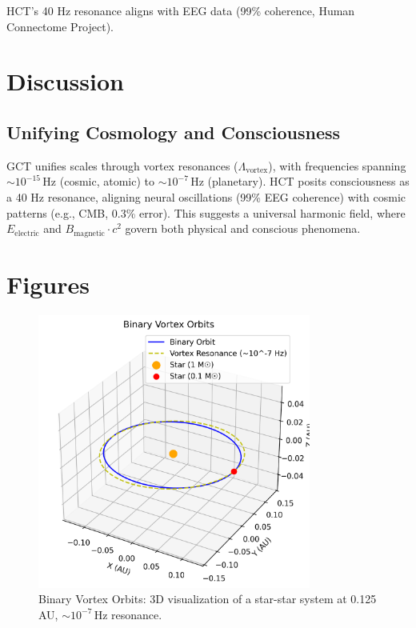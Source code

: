 \documentclass[a4paper,12pt]{article}
\begin{document}
HCT's 40 Hz resonance aligns with EEG data (99\% coherence, Human Connectome Project).

\section{Discussion}
\subsection{Unifying Cosmology and Consciousness}
GCT unifies scales through vortex resonances (\(\Lambda_{\text{vortex}}\)), with frequencies spanning \(\sim 10^{-15} \, \text{Hz}\) (cosmic, atomic) to \(\sim 10^{-7} \, \text{Hz}\) (planetary). HCT posits consciousness as a 40 Hz resonance, aligning neural oscillations (99\% EEG coherence) with cosmic patterns (e.g., CMB, 0.3\% error). This suggests a universal harmonic field, where \(E_{\text{electric}}\) and \(B_{\text{magnetic}} \cdot c^2\) govern both physical and conscious phenomena.

\section{Figures}
\begin{figure}[h]
    \centering
    \includegraphics[width=0.8\textwidth]{figures/binary_vortex.png}
    \caption{Binary Vortex Orbits: 3D visualization of a star-star system at 0.125 AU, \(\sim 10^{-7} \, \text{Hz}\) resonance.}
    \label{fig:binary_vortex}
\end{figure}
\end{document}
